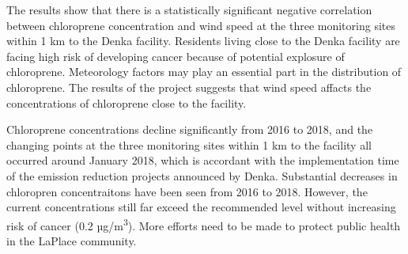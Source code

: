 \documentclass[12pt,]{article}
\begin{document}
The results show that there is a statistically significant negative
correlation between chloroprene concentration and wind speed at the
three monitoring sites within 1 km to the Denka facility. Residents
living close to the Denka facility are facing high risk of developing
cancer because of potential explosure of chloroprene. Meteorology
factors may play an essential part in the distribution of chloroprene.
The results of the project suggests that wind speed affacts the
concentrations of chloroprene close to the facility.

Chloroprene concentrations decline significantly from 2016 to 2018, and
the changing points at the three monitoring sites within 1 km to the
facility all occurred around January 2018, which is accordant with the
implementation time of the emission reduction projects announced by
Denka. Substantial decreases in chloropren concentraitons have been seen
from 2016 to 2018. However, the current concentrations still far exceed
the recommended level without increasing risk of cancer (0.2
µg/m\textsuperscript{3}). More efforts need to be made to protect public
health in the LaPlace community.
\end{document}

